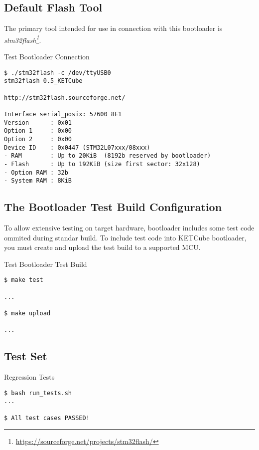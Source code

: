 \subsection{Default Flash Tool}

The primary tool intended for use in connection with this bootloader is {\it stm32flash\footnote{\url{https://sourceforge.net/projects/stm32flash/}}}.

\begin{docCodeExampleTitled}{Test Bootloader Connection}
\begin{verbatim}
$ ./stm32flash -c /dev/ttyUSB0 
stm32flash 0.5_KETCube

http://stm32flash.sourceforge.net/

Interface serial_posix: 57600 8E1
Version      : 0x01
Option 1     : 0x00
Option 2     : 0x00
Device ID    : 0x0447 (STM32L07xxx/08xxx)
- RAM        : Up to 20KiB  (8192b reserved by bootloader)
- Flash      : Up to 192KiB (size first sector: 32x128)
- Option RAM : 32b
- System RAM : 8KiB
\end{verbatim}
\end{docCodeExampleTitled}

\subsection{The Bootloader Test Build Configuration}

To allow extensive testing on target hardware, bootloader includes some test code ommited during standar build. 
To include test code into KETCube bootloader, you must create and upload the test build to a supported MCU.

\begin{docCodeExampleTitled}{Test Bootloader Test Build}
\begin{verbatim}
$ make test

...

$ make upload

...

\end{verbatim}
\end{docCodeExampleTitled}

\subsection{Test Set}

\begin{docCodeExampleTitled}{Regression Tests}
\begin{verbatim}
$ bash run_tests.sh
...

$ All test cases PASSED!
\end{verbatim}
\end{docCodeExampleTitled}

